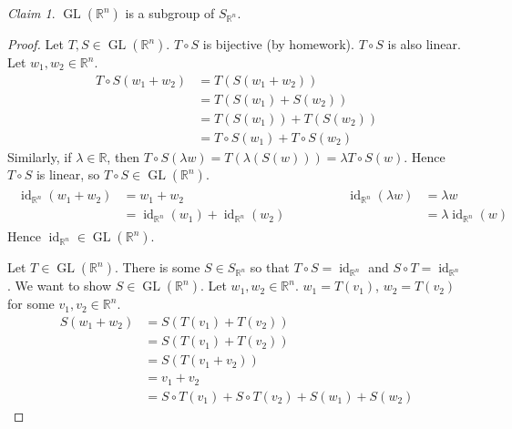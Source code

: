 \documentclass[12pt,letterpaper,DIV=11,final]{scrartcl}
\theoremstyle{plain}
\theoremstyle{definition}
\theoremstyle{remark}
\newtheorem{claim}{Claim}
\DeclareMathOperator{\id}{id}
\DeclareMathOperator{\gl}{GL} %
\begin{document}
\begin{claim}
  $\gl(\mathbb{R}^n)$ is a subgroup of $S_{\mathbb{R}^n}$.

  \begin{proof}
    Let $T, S \in \gl(\mathbb{R}^n)$.
    $T \circ S$ is bijective (by homework).
    $T \circ S$ is also linear.
    Let $w_1, w_2 \in \mathbb{R}^n$.
    \begin{align*}
      T \circ S (w_1 + w_2) &= T(S(w_1 + w_2)) \\
                            &= T(S(w_1) + S(w_2)) \\
                            &= T(S(w_1)) + T(S(w_2)) \\
                            &= T \circ S(w_1) + T \circ S(w_2)
    \end{align*}
    Similarly, if $\lambda \in \mathbb{R}$, then $T \circ S (\lambda w) = T(\lambda (S(w))) = \lambda T \circ S(w)$.
    Hence $T \circ S$ is linear, so $T \circ S \in \gl(\mathbb{R}^n)$.
    \begin{align*}
      \begin{aligned}
        \id_{\mathbb{R}^n}(w_1 + w_2) &= w_1 + w_2 \\
                                      &= \id_{\mathbb{R}^n}(w_1) + \id_{\mathbb{R}^n}(w_2)
      \end{aligned}
      \qquad \qquad
      \begin{aligned}
        \id_{\mathbb{R}^n}(\lambda w) &= \lambda w \\
                                      &= \lambda \id_{\mathbb{R}^n}(w)
      \end{aligned}
    \end{align*}
    Hence $\id_{\mathbb{R}^n} \in \gl(\mathbb{R}^n)$.

    Let $T \in \gl(\mathbb{R}^n)$.
    There is some $S \in S_{\mathbb{R}^n}$ so that $T \circ S = \id_{\mathbb{R}^n}$ and $S \circ T = \id_{\mathbb{R}^n}$.
    We want to show $S \in \gl(\mathbb{R}^n)$.
    Let $w_1, w_2 \in \mathbb{R}^n$.
    $w_1 = T(v_1)$, $w_2 = T(v_2)$ for some $v_1, v_2 \in \mathbb{R}^n$.
    \begin{align*}
      S(w_1 + w_2) &= S(T(v_1) + T(v_2)) \\
                   &= S(T(v_1) + T(v_2)) \\
                   &= S(T(v_1 + v_2)) \\
                   &= v_1 + v_2 \\
                   &= S \circ T(v_1) + S \circ T(v_2) + S(w_1) + S(w_2)
    \end{align*}


\end{proof}
\end{claim}
\end{document}
